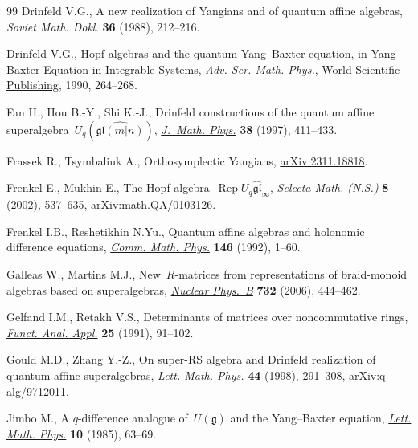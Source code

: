 \documentclass[10pt,a4paper]{amsart}
\numberwithin{equation}{section}
\begin{document}
\begin{thebibliography}{99}
Drinfeld V.G., A new realization of {Y}angians and of quantum affine algebras,
 \textit{Soviet Math. Dokl.} \textbf{36} (1988), 212--216.

Drinfeld V.G., Hopf algebras and the quantum {Y}ang--{B}axter equation, in
 Yang--{B}axter {E}quation in {I}ntegrable {S}ystems, \textit{Adv. Ser. Math. Phys.},
 \href{https://doi.org/10.1142/9789812798336_0013}{World Scientific Publishing}, 1990, 264--268.

Fan H., Hou B.-Y., Shi K.-J., Drinfeld constructions of the quantum affine
 superalgebra~{$U_q(\widehat {\mathfrak{gl}(m|n)})$}, \href{https://doi.org/10.1063/1.532188}{\textit{J.~Math. Phys.}}
 \textbf{38} (1997), 411--433.

Frassek R., Tsymbaliuk A., Orthosymplectic {Y}angians, \href{https://arxiv.org/abs/2311.18818}{arXiv:2311.18818}.

Frenkel E., Mukhin E., The {H}opf algebra~{$\operatorname{Rep} U_q\widehat{\mathfrak{gl}}_\infty$}, \href{https://doi.org/10.1007/PL00012603}{\textit{Selecta Math. (N.S.)}}
 \textbf{8} (2002), 537--635, \href{https://arxiv.org/abs/math.QA/0103126}{arXiv:math.QA/0103126}.

Frenkel I.B., Reshetikhin N.Yu., Quantum affine algebras and holonomic
 difference equations, \href{https://doi.org/10.1007/bf02099206}{\textit{Comm. Math. Phys.}} \textbf{146} (1992), 1--60.

Galleas W., Martins M.J., New~{$R$}-matrices from representations of
 braid-monoid algebras based on superalgebras, \href{https://doi.org/10.1016/j.nuclphysb.2005.10.025}{\textit{Nuclear Phys.~B}}
 \textbf{732} (2006), 444--462.

Gelfand I.M., Retakh V.S., Determinants of matrices over noncommutative rings,
 \href{https://doi.org/10.1007/BF01079588}{\textit{Funct. Anal. Appl.}} \textbf{25} (1991), 91--102.

Gould M.D., Zhang Y.-Z., On super-{RS} algebra and {D}rinfeld realization of
 quantum affine superalgebras, \href{https://doi.org/10.1023/A:1007494602290}{\textit{Lett. Math. Phys.}} \textbf{44} (1998),
 291--308, \href{https://arxiv.org/abs/q-alg/9712011}{arXiv:q-alg/9712011}.

Jimbo M., A {$q$}-difference analogue of~{$U(\mathfrak{g})$} and the
 {Y}ang--{B}axter equation, \href{https://doi.org/10.1007/BF00704588}{\textit{Lett. Math. Phys.}} \textbf{10} (1985),
 63--69.


\end{thebibliography}
\end{document}
